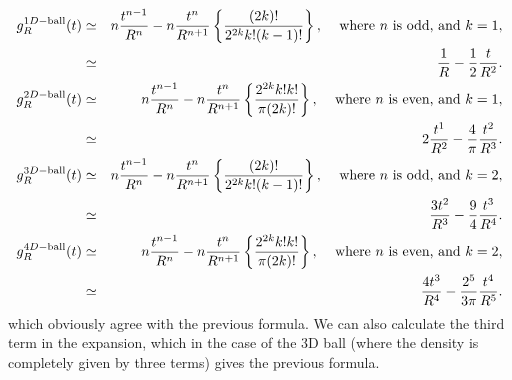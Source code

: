 \documentclass{article}
\begin{document}
\begin{eqnarray}
  \label{eq:ex_g(t)}
g^{1D-{\rm ball}}_R(t)
 & \simeq &                        
  n \frac{t^{n-1}}{R^n} - 
    n \frac{t^{n}}{R^{n+1}} 
   \left\{  \frac{(2k)! }{2^{2k} k! (k-1)!}  \right\},
                 \;\;\; \mbox{ where $n$ is odd, and } k=1,  \nonumber \\
 & \simeq &                          %
  \frac{1}{R} - 
    \frac{1}{2} \frac{t}{R^{2}}. 
                 \\
g^{2D-{\rm ball}}_R(t)
 & \simeq &                          %
  n \frac{t^{n-1}}{R^n} - 
    n \frac{t^{n}}{R^{n+1}} 
   \left\{ \frac{2^{2k} k! k!}{\pi (2k)!}  \right\},
                 \;\;\; \mbox{ where $n$ is even, and } k=1,  \nonumber \\
 & \simeq &                          %
  2 \frac{t^{1}}{R^2} - 
    \frac{4}{\pi} \frac{t^{2}}{R^{3}} .
                  \\
g^{3D-{\rm ball}}_R(t)
 & \simeq &                          %
  n \frac{t^{n-1}}{R^n} - 
    n \frac{t^{n}}{R^{n+1}} 
   \left\{ \frac{(2k)! }{2^{2k} k! (k-1)!}  \right\},
                 \;\;\; \mbox{ where $n$ is odd, and } k=2,  \nonumber \\
 & \simeq &                          %
  \frac{3 t^{2}}{R^3} - 
     \frac{9}{4} \frac{t^{3}}{R^{4}} .
   \\ 
g^{4D-{\rm ball}}_R(t)
 & \simeq &                          %
  n \frac{t^{n-1}}{R^n} -  
    n \frac{t^{n}}{R^{n+1}} 
   \left\{ \frac{2^{2k} k! k!}{\pi (2k)!} \right\},
                 \;\;\; \mbox{ where $n$ is even, and } k=2, \nonumber \\
 & \simeq &                          %
  \frac{4 t^{3}}{R^4} -  
    \frac{2^5}{3\pi} \frac{t^{4}}{R^{5}} .
\end{eqnarray}
which obviously agree with the previous formula. We can also calculate
the third term in the expansion, which in the case of the 3D ball
(where the density is completely given by three terms) gives the
previous formula.
\end{document}
